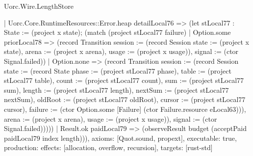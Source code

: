 \begin{lexlean}{Uorc.Wire.LengthStore}
\begin{semanticmodule}
{      | Uorc.Core.RuntimeResources::Error.heap detailLocal76 => (let stLocal77 : State := (project x state); (match (project stLocal77 failure)
        | Option.some priorLocal78 => (record Transition {session := (record Session {state := (project x state), arena := (project x arena), usage := (project x usage)}), signal := (ctor Signal.failed)})
        | Option.none => (record Transition {session := (record Session {state := (record State {phase := (project stLocal77 phase), table := (project stLocal77 table), count := (project stLocal77 count), sum := (project stLocal77 sum), length := (project stLocal77 length), nextSum := (project stLocal77 nextSum), oldRoot := (project stLocal77 oldRoot), cursor := (project stLocal77 cursor), failure := (ctor Option.some [Failure] (ctor Failure.resource eLocal63))}), arena := (project x arena), usage := (project x usage)}), signal := (ctor Signal.failed)}))))
    | Result.ok paidLocal79 => (observeResult budget (acceptPaid paidLocal79 index length))),
  axioms: [Quot.sound, propext],
  executable: true,
  production: {effects: [allocation, overflow, recursion], targets: [rust-std]}
}


\end{semanticmodule}
\end{lexlean}

